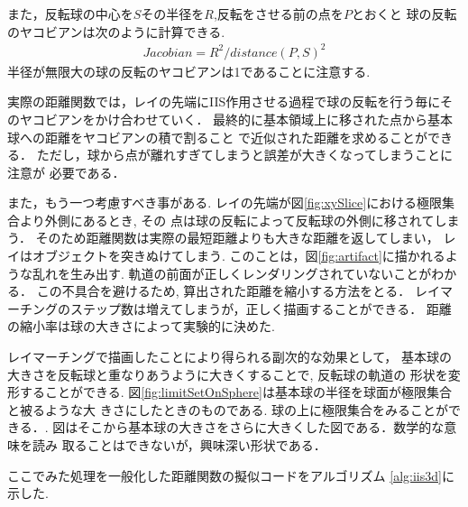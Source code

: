 また，反転球の中心を$S$その半径を$R$,反転をさせる前の点を$P$とおくと
球の反転のヤコビアンは次のように計算できる.
\begin{align*}
 Jacobian = R^2 / distance(P, S)^2 
\end{align*}
半径が無限大の球の反転のヤコビアンは1であることに注意する.

実際の距離関数では，レイの先端にIIS作用させる過程で球の反転を行う毎にそ
のヤコビアンをかけ合わせていく．
最終的に基本領域上に移された点から基本球への距離をヤコビアンの積で割ること
で近似された距離を求めることができる．
ただし，球から点が離れすぎてしまうと誤差が大きくなってしまうことに注意が
必要である．

また，もう一つ考慮すべき事がある.
レイの先端が図\ref{fig:xySlice}における極限集合より外側にあるとき, その
点は球の反転によって反転球の外側に移されてしまう．
そのため距離関数は実際の最短距離よりも大きな距離を返してしまい，
レイはオブジェクトを突きぬけてしまう.
このことは，図\ref{fig:artifact}に描かれるような乱れを生み出す.
軌道の前面が正しくレンダリングされていないことがわかる．
この不具合を避けるため, 算出された距離を縮小する方法をとる．
レイマーチングのステップ数は増えてしまうが，正しく描画することができる．
距離の縮小率は球の大きさによって実験的に決めた.

レイマーチングで描画したことにより得られる副次的な効果として，
基本球の大きさを反転球と重なりあうように大きくすることで, 反転球の軌道の
形状を変形することができる.
図\ref{fig:limitSetOnSphere}は基本球の半径を球面が極限集合と被るような大
きさにしたときのものである.
球の上に極限集合をみることができる．.
図はそこから基本球の大きさをさらに大きくした図である．数学的な意味を読み
取ることはできないが，興味深い形状である．

ここでみた処理を一般化した距離関数の擬似コードをアルゴリズム
\ref{alg:iis3d}に示した.

